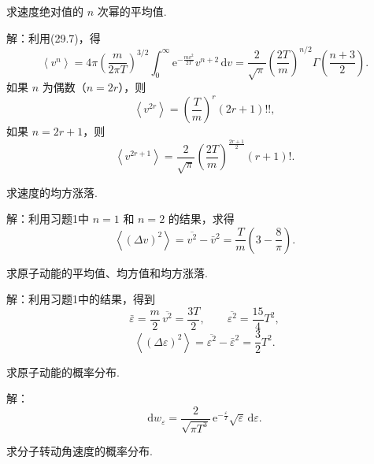 \begin{xiti}

\quad 求速度绝对值的 $n$ 次幂的平均值.

解：利用(29.7)，得
\begin{equation*}
  \left\langle v^n\right\rangle=4\pi\left(\frac{m}{2\pi T}\right)^{3/2}
  \int_0^{\infty}\mathrm{e}^{-\frac{mv^2}{2T}}v^{n+2}\,\mathrm{d}v
  =\frac{2}{\sqrt{\pi}}\left(\frac{2T}{m}\right)^{n/2}\Gamma\left(\frac{n+3}{2}\right).
\end{equation*}
如果 $n$ 为偶数（$n=2r$），则
\begin{equation*}
  \left\langle v^{2r}\right\rangle=\left(\frac{T}{m}\right)^r(2r+1)!!,
\end{equation*}
如果 $n=2r+1$，则
\begin{equation*}
  \left\langle v^{2r+1}\right\rangle=\frac{2}{\sqrt{\pi}}\left(\frac{2T}{m}\right)^{\frac{2r+1}{2}}(r+1)!.
\end{equation*}

\quad 求速度的均方涨落.

解：利用习题1中 $n=1$ 和 $n=2$ 的结果，求得
\begin{equation*}
  \left\langle(\Delta v)^2\right\rangle=\overline{v^2}-\bar{v}^2=\frac{T}{m}\left(3-\frac{8}{\pi}\right).
\end{equation*}

\quad 求原子动能的平均值、均方值和均方涨落.

解：利用习题1中的结果，得到
\begin{equation*}
  \bar{\varepsilon}=\frac{m}{2}\,\overline{v^2}=\frac{3T}{2},\qquad
  \overline{\varepsilon^2}=\frac{15}{4}T^2,
\end{equation*}
\begin{equation*}
  \left\langle(\Delta\varepsilon)^2\right\rangle=\overline{\varepsilon^2}-\bar{\varepsilon}^2=\frac{3}{2}T^2.
\end{equation*}

\quad 求原子动能的概率分布.

解：
\begin{equation*}
  \mathrm{d}w_\varepsilon=\frac{2}{\sqrt{\pi T^3}}\,\mathrm{e}^{-\frac{\varepsilon}{T}}\sqrt{\varepsilon}\,\mathrm{d}\varepsilon.
\end{equation*}

\quad 求分子转动角速度的概率分布.


\end{xiti}
